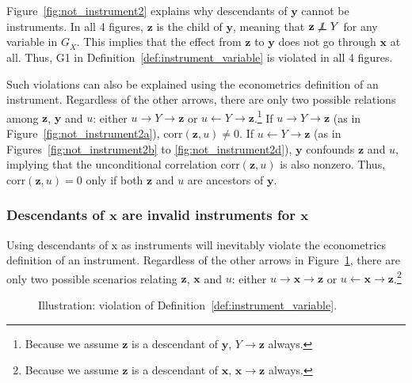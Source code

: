 \documentclass[11pt,review,authoryear]{elsarticle}
\begin{document}
Figure~\ref{fig:not_instrument2} explains why descendants of $\mathbf{y}$ cannot be instruments. In all 4 figures, $\mathbf{z}$ is the child of $\mathbf{y}$, meaning that $\mathbf{z} \not\perp\!\!\!\!\perp Y$ for any variable in $G_{\overline{X}}$. This implies that the effect from $\mathbf{z}$ to $\mathbf{y}$ does not go through $\mathbf{x}$ at all. Thus, G1 in Definition~\ref{def:instrument_variable} is violated in all 4 figures.

Such violations can also be explained using the econometrics definition of an instrument. Regardless of the other arrows, there are only two possible relations among $\mathbf{z}$, $\mathbf{y}$ and $u$: either $u \rightarrow Y \rightarrow \mathbf{z}$ or $u \leftarrow Y \rightarrow \mathbf{z}$.\footnote{Because we assume $\mathbf{z}$ is a descendant of $\mathbf{y}$, $Y \rightarrow \mathbf{z}$ always.} If $u \rightarrow Y \rightarrow \mathbf{z}$ (as in Figure~\ref{fig:not_instrument2a}), $\mathrm{corr} \left( \mathbf{z}, u \right) \neq 0$. If $u \leftarrow Y \rightarrow \mathbf{z}$ (as in Figures~\ref{fig:not_instrument2b} to \ref{fig:not_instrument2d}), $\mathbf{y}$ confounds $\mathbf{z}$ and $u$, implying that the unconditional correlation $\mathrm{corr} \left( \mathbf{z}, u \right)$ is also nonzero. Thus, $\mathrm{corr} \left( \mathbf{z}, u \right)=0$ only if both $\mathbf{z}$ and $u$ are ancestors of $\mathbf{y}$.

\subsubsection*{Descendants of $\mathbf{x}$ are invalid instruments for $\mathbf{x}$}

Using descendants of $\mathrm{x}$ as instruments will inevitably violate the econometrics definition of an instrument. Regardless of the other arrows in Figure~\ref{fig:not_instrument3}, there are only two possible scenarios relating $\mathbf{z}$, $\mathbf{x}$ and $u$: either $u \rightarrow \mathbf{x} \rightarrow \mathbf{z}$ or $u \leftarrow \mathbf{x} \rightarrow \mathbf{z}$.\footnote{Because we assume $\mathbf{z}$ is a descendant of $\mathbf{x}$, $\mathbf{x} \rightarrow \mathbf{z}$ always.}

\begin{figure}[H]
	\centering
	\hfil
	\hfil
	\hfil
	\caption{Illustration: violation of Definition~\ref{def:instrument_variable}.}
	\label{fig:not_instrument3}
\end{figure}
\end{document}
